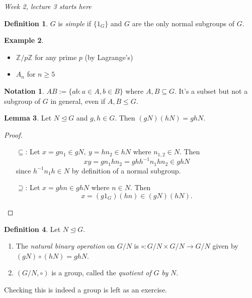 \documentclass[a4paper]{article}
\theoremstyle{definition}
\newtheorem{defn}{Definition}[subsection]
\newtheorem{lemma}[defn]{Lemma}
\newtheorem{example}[defn]{Example}
\newtheorem*{notation}{Notation}
\begin{document}
\begin{flushright}
\textit{Week 2, lecture 3 starts here}
\end{flushright}

\begin{defn}
$G$ is \textit{simple} if $\{1_G\}$ and $G$ are the only normal subgroups of $G$.
\end{defn}
\begin{example}
\begin{itemize}
\item $\mathbb Z/p\mathbb Z$ for any prime $p$ (by Lagrange's)
\item $A_n$ for $n\geq 5$
\end{itemize}
\end{example}
\begin{notation}
$AB:=\{ab:a\in A,b\in B\}$ where $A,B\subseteq G$. It's a subset but not a subgroup of $G$ in general, even if $A,B\leq G$.
\end{notation}
\begin{lemma}
Let $N\unlhd G$ and $g,h\in G$. Then $(gN)(hN)=ghN$.
\end{lemma}
\begin{proof}
\begin{itemize}
\item[$\subseteq$:] Let $x=gn_1\in gN,\ y=hn_2\in hN$ where $n_{1,2}\in N$. Then
\[
xy=gn_1hn_2=ghh^{-1}n_1hn_2 \in ghN
\]
since $h^{-1}n_1h\in N$ by definition of a normal subgroup.
\item[$\supseteq$:] Let $x=ghn\in ghN$ where $n\in N$. Then
\[
x=(g1_G)(hn)\in (gN)(hN).
\]
\end{itemize}
\end{proof}
\begin{defn}
Let $N\unlhd G$.
\begin{enumerate}
\item The \textit{natural binary operation} on $G/N$ is $\circ:G/N\times G/N\rightarrow G/N$ given by $(gN)\circ(hN)=ghN$.
\item $(G/N,\circ)$ is a group, called the \textit{quotient of} $G$ \textit{by} $N$.
\end{enumerate}
\end{defn}
Checking this is indeed a group is left as an exercise.
\end{document}
